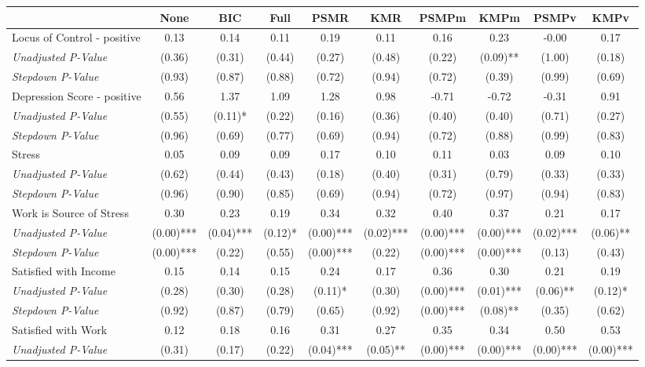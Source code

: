 \begin{tabular}{l c c c c c c c c c}
\toprule
 & None & BIC & Full & PSMR & KMR & PSMPm & KMPm & PSMPv & KMPv \\
\midrule
Locus of Control - positive & 0.13 & 0.14 & 0.11 & 0.19 & 0.11 & 0.16 & 0.23 & -0.00 & 0.17 \\
\quad \textit{Unadjusted P-Value} & (0.36) & (0.31) & (0.44) & (0.27) & (0.48) & (0.22) & (0.09)** & (1.00) & (0.18) \\
\quad \textit{Stepdown P-Value} & (0.93) & (0.87) & (0.88) & (0.72) & (0.94) & (0.72) & (0.39) & (0.99) & (0.69) \\
Depression Score - positive & 0.56 & 1.37 & 1.09 & 1.28 & 0.98 & -0.71 & -0.72 & -0.31 & 0.91 \\
\quad \textit{Unadjusted P-Value} & (0.55) & (0.11)* & (0.22) & (0.16) & (0.36) & (0.40) & (0.40) & (0.71) & (0.27) \\
\quad \textit{Stepdown P-Value} & (0.96) & (0.69) & (0.77) & (0.69) & (0.94) & (0.72) & (0.88) & (0.99) & (0.83) \\
Stress & 0.05 & 0.09 & 0.09 & 0.17 & 0.10 & 0.11 & 0.03 & 0.09 & 0.10 \\
\quad \textit{Unadjusted P-Value} & (0.62) & (0.44) & (0.43) & (0.18) & (0.40) & (0.31) & (0.79) & (0.33) & (0.33) \\
\quad \textit{Stepdown P-Value} & (0.96) & (0.90) & (0.85) & (0.69) & (0.94) & (0.72) & (0.97) & (0.94) & (0.83) \\
Work is Source of Stress & 0.30 & 0.23 & 0.19 & 0.34 & 0.32 & 0.40 & 0.37 & 0.21 & 0.17 \\
\quad \textit{Unadjusted P-Value} & (0.00)*** & (0.04)*** & (0.12)* & (0.00)*** & (0.02)*** & (0.00)*** & (0.00)*** & (0.02)*** & (0.06)** \\
\quad \textit{Stepdown P-Value} & (0.00)*** & (0.22) & (0.55) & (0.00)*** & (0.22) & (0.00)*** & (0.00)*** & (0.13) & (0.43) \\
Satisfied with Income & 0.15 & 0.14 & 0.15 & 0.24 & 0.17 & 0.36 & 0.30 & 0.21 & 0.19 \\
\quad \textit{Unadjusted P-Value} & (0.28) & (0.30) & (0.28) & (0.11)* & (0.30) & (0.00)*** & (0.01)*** & (0.06)** & (0.12)* \\
\quad \textit{Stepdown P-Value} & (0.92) & (0.87) & (0.79) & (0.65) & (0.92) & (0.00)*** & (0.08)** & (0.35) & (0.62) \\
Satisfied with Work & 0.12 & 0.18 & 0.16 & 0.31 & 0.27 & 0.35 & 0.34 & 0.50 & 0.53 \\
\quad \textit{Unadjusted P-Value} & (0.31) & (0.17) & (0.22) & (0.04)*** & (0.05)** & (0.00)*** & (0.00)*** & (0.00)*** & (0.00)*** \\

\end{tabular}
